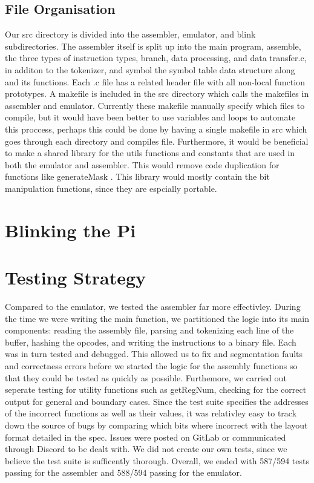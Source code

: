 \documentclass[11pt]{article}
\begin{document}
\subsection{File Organisation}
Our src directory is divided into the assembler, emulator, and blink subdirectories. The assembler itself is split up into the main program, assemble, the three types of instruction types, branch, data processing, and data transfer.c, in additon to the tokenizer, and symbol the symbol table data structure along and its functions. Each .c file has a related header file with all non-local function prototypes. A makefile is included in the src directory which calls the makefiles in assembler and emulator. Currently these makefile manually specify which files to compile, but it would have been better to use variables and loops to automate this proccess, perhaps this could be done by having a single makefile in src which goes through each directory and compiles file. Furthermore, it would be beneficial to make a shared library for the utils functions and constants that are used in both the emulator and assembler. This would remove code duplication for functions like generateMask . This library would mostly contain the bit manipulation functions, since they are espcially portable. 

\section{Blinking the Pi}


\section{Testing Strategy}
Compared to the emulator, we tested the assembler far more effectivley. During the time we were writing the main function, we partitioned the logic into its main components: reading the assembly file, parsing and tokenizing each line of the buffer, hashing the opcodes, and writing the instructions to a binary file. Each was in turn tested and debugged. This allowed us to fix and segmentation faults and correctness errors before we started the logic for the assembly functions so that they could be tested as quickly as possible. Furthemore, we carried out seperate testing for utility functions such as getRegNum, checking for the correct output for general and boundary cases. Since the test suite specifies the addresses of the incorrect functions as well as their values, it was relativley easy to track down the source of bugs by comparing which bits where incorrect with the layout format detailed in the spec.  Issues were posted on GitLab or communicated through Discord to be dealt with. We did not create our own tests, since we believe the test suite is sufficently thorough. Overall, we ended with 587/594 tests passing for the assembler and 588/594 passing for the emulator. 
\end{document}
